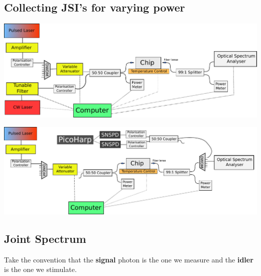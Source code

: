 \subsection{Collecting JSI's for varying power}



\begingroup
    \centering  
    \includegraphics[width=18cm]{img/method/setup_2.pdf}
     \vspace{3pt} \label{bigJSIExp}
\endgroup




\begingroup
    \centering  
    \includegraphics[width=18cm]{img/method/setup_3.pdf}
     \vspace{3pt} \label{crossCompare3}
\endgroup




\subsection{Joint Spectrum}
Take the convention that the {\bf signal} photon is the one we measure and the {\bf idler} is the one we stimulate.

